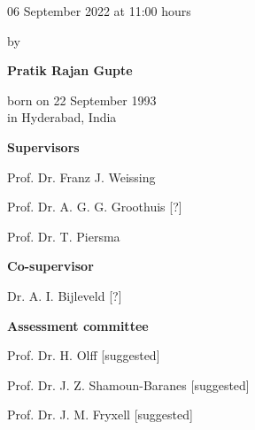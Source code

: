\begin{titlepage}
\begin{addmargin}[-1cm]{-3cm}
\begin{center}
{            \vspace{3mm}

            06 September 2022 at 11:00 hours

            \vspace{12mm}

            by

            \vspace{12mm}

            \textbf{Pratik Rajan Gupte}

            \vspace{3mm}

            born on 22 September 1993\\
            in Hyderabad, India
        }

    \end{center}

    \pagebreak
    \thispagestyle{empty}

    \textbf{Supervisors}
    \begin{description}
        \item Prof. Dr. Franz J. Weissing
        \item Prof. Dr. A. G. G. Groothuis [?]
        \item Prof. Dr. T. Piersma
    \end{description}

    \vspace{6mm}

    \textbf{Co-supervisor}
    \begin{description}
        \item Dr. A. I. Bijleveld [?]
    \end{description}

    \vspace{6mm}

    \textbf{Assessment committee}
    \begin{description}
        \item Prof. Dr. H. Olff [suggested]
        \item Prof. Dr. J. Z. Shamoun-Baranes [suggested]
        \item Prof. Dr. J. M. Fryxell [suggested]
    \end{description}

  \end{addmargin}

\end{titlepage}


    

